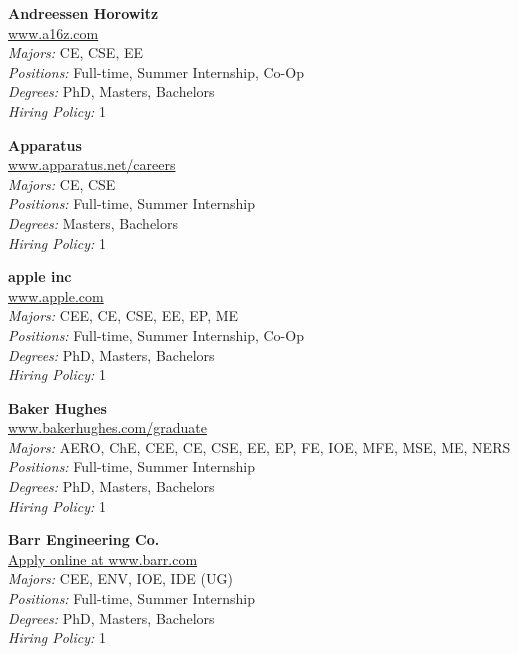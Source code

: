 \documentclass[twoside]{article}
\begin{document}
\begin{center}
\begin{multicols}{3}
\begin{minipage}{.9\columnwidth}{\Large\bf Andreessen Horowitz }\\
	\url{www.a16z.com}\\
	\emph{Majors:} CE, CSE, EE\\
	\emph{Positions:} Full-time, Summer Internship, Co-Op\\
	\emph{Degrees:} PhD, Masters, Bachelors\\
	\emph{Hiring Policy:} 1\\
\end{minipage}
 
\begin{minipage}{.9\columnwidth}{\Large\bf Apparatus }\\
	\url{www.apparatus.net/careers}\\
	\emph{Majors:} CE, CSE\\
	\emph{Positions:} Full-time, Summer Internship\\
	\emph{Degrees:} Masters, Bachelors\\
	\emph{Hiring Policy:} 1\\
\end{minipage}
 
\begin{minipage}{.9\columnwidth}{\Large\bf apple inc }\\
	\url{www.apple.com}\\
	\emph{Majors:} CEE, CE, CSE, EE, EP, ME\\
	\emph{Positions:} Full-time, Summer Internship, Co-Op\\
	\emph{Degrees:} PhD, Masters, Bachelors\\
	\emph{Hiring Policy:} 1\\
\end{minipage}
 
\begin{minipage}{.9\columnwidth}{\Large\bf Baker Hughes }\\
	\url{www.bakerhughes.com/graduate}\\
	\emph{Majors:} AERO, ChE, CEE, CE, CSE, EE, EP, FE, IOE, MFE, MSE, ME, NERS\\
	\emph{Positions:} Full-time, Summer Internship\\
	\emph{Degrees:} PhD, Masters, Bachelors\\
	\emph{Hiring Policy:} 1\\
\end{minipage}
 
\begin{minipage}{.9\columnwidth}{\Large\bf Barr Engineering Co. }\\
	\url{Apply online at www.barr.com}\\
	\emph{Majors:} CEE, ENV, IOE, IDE (UG)\\
	\emph{Positions:} Full-time, Summer Internship\\
	\emph{Degrees:} PhD, Masters, Bachelors\\
	\emph{Hiring Policy:} 1\\
\end{minipage}
 

\end{multicols}
\end{center}
\end{document}
